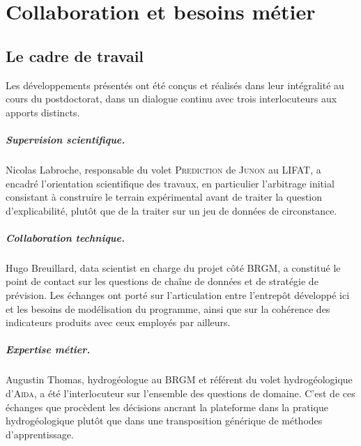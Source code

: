 \chapter{Collaboration et besoins métier}
\label{ch:collaborations}


\section{Le cadre de travail}

Les développements présentés ont été conçus et réalisés dans leur intégralité au cours du
postdoctorat, dans un dialogue continu avec trois interlocuteurs aux apports distincts.

\paragraph{Supervision scientifique.} Nicolas Labroche, responsable du volet \textsc{Prediction}
de \textsc{Junon} au LIFAT, a encadré l'orientation scientifique des travaux, en particulier
l'arbitrage initial consistant à construire le terrain expérimental avant de traiter la question
d'explicabilité, plutôt que de la traiter sur un jeu de données de circonstance.

\paragraph{Collaboration technique.} Hugo Breuillard, data scientist en charge du projet côté
BRGM, a constitué le point de contact sur les questions de chaîne de données et de stratégie de
prévision. Les échanges ont porté sur l'articulation entre l'entrepôt développé ici et les
besoins de modélisation du programme, ainsi que sur la cohérence des indicateurs produits avec
ceux employés par ailleurs.

\paragraph{Expertise métier.} Augustin Thomas, hydrogéologue au BRGM et référent du volet
hydrogéologique d'\textsc{Aida}, a été l'interlocuteur sur l'ensemble des questions de domaine.
C'est de ces échanges que procèdent les décisions ancrant la plateforme dans la pratique
hydrogéologique plutôt que dans une transposition générique de méthodes d'apprentissage.

